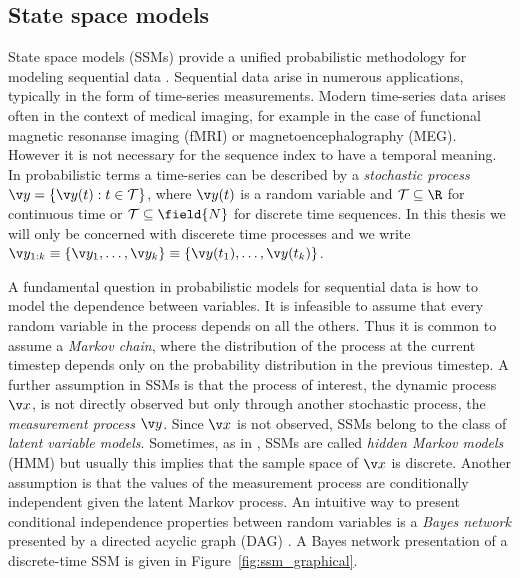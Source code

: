 \subsection{State space models}

State space models (SSMs) provide a unified probabilistic methodology for modeling
sequential data \parencite{ljung1994modeling,durbin2012time,Cappe2005,barber2011bayesian}. Sequential data arise in numerous applications, 
typically in the form of time-series measurements. Modern time-series data arises often in the context of medical imaging,
for example in the case of functional magnetic resonanse imaging (fMRI) or magnetoencephalography (MEG).
However it is not necessary for the sequence index to have
a temporal meaning. In probabilistic terms a time-series
can be described by a \emph{stochastic process} $\y = \left\{\y(t): t\in \mathcal{T}\right\}$, 
where $\y(t)$ is a random variable and $\mathcal{T}\subseteq\R$ for continuous time or 
$\mathcal{T}\subseteq\field{N}$ for discrete time sequences.
In this thesis we will only be concerned with discerete time processes 
and we write $\y_{1:k}\equiv\{\y_1,\dots,\y_k\}\equiv\{\y(t_1),\dots,\y(t_k)\}$.

A fundamental question in probabilistic models for sequential data is how 
to model the dependence between variables. It is infeasible to assume
that every random variable in the process depends on all the others.
Thus it is common to assume a \emph{Markov chain}, where the distribution of
the process at the current timestep depends only on the probability distribution in the previous timestep.
A further assumption in SSMs is that the process of interest, the dynamic process $\x$, is not directly observed
but only through another stochastic process, the \emph{measurement process} $\y$. Since
$\x$ is not observed, SSMs belong to the class of \emph{latent variable models}. Sometimes, as in
\textcite{Cappe2005}, SSMs are called \emph{hidden Markov models} (HMM) but usually this implies that
the sample space of $\x$ is discrete. Another assumption is that the values of the measurement process are conditionally independent
given the latent Markov process.
An intuitive way to present conditional independence properties between random
variables is a \emph{Bayes network} presented by a directed acyclic graph (DAG) \parencite{pearl1988probabilistic,Bishop2006}.
A Bayes network presentation of a discrete-time SSM is given in Figure~\ref{fig:ssm_graphical}.

